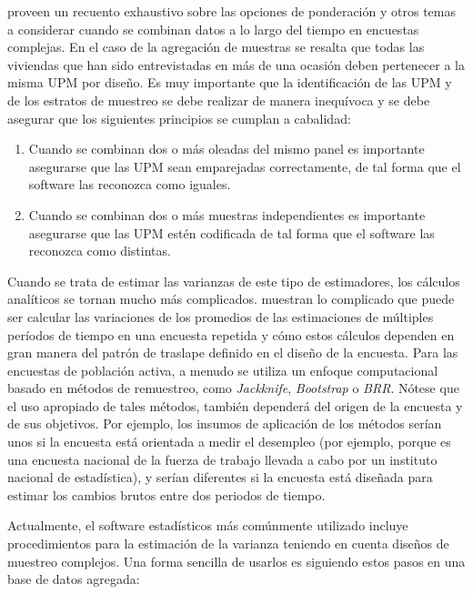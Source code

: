 \documentclass[
  10pt,
  spanish,
]{book}
\providecommand{\tightlist}{%
  \setlength{\itemsep}{0pt}\setlength{\parskip}{0pt}}
\begin{document}
\citet[capítulos 7 y 8]{Korn_Graubard_1999} proveen un recuento exhaustivo
sobre las opciones de ponderación y otros temas a considerar cuando se
combinan datos a lo largo del tiempo en encuestas complejas. En el caso
de la agregación de muestras se resalta que todas las viviendas que han
sido entrevistadas en más de una ocasión deben pertenecer a la misma UPM
por diseño. Es muy importante que la identificación de las UPM y de los
estratos de muestreo se debe realizar de manera inequívoca y se debe
asegurar que los siguientes principios se cumplan a cabalidad:

\begin{enumerate}
\def\labelenumi{\arabic{enumi}.}
\tightlist
\item
  Cuando se combinan dos o más oleadas del mismo panel es importante
  asegurarse que las UPM sean emparejadas correctamente, de tal forma
  que el software las reconozca como iguales.
\item
  Cuando se combinan dos o más muestras independientes es importante
  asegurarse que las UPM estén codificada de tal forma que el software
  las reconozca como distintas.
\end{enumerate}

Cuando se trata de estimar las varianzas de este tipo de estimadores,
los cálculos analíticos se tornan mucho más complicados.
\citet{Train_Cahoon_Makens_1978} muestran lo complicado que puede ser calcular
las variaciones de los promedios de las estimaciones de múltiples
períodos de tiempo en una encuesta repetida y cómo estos cálculos
dependen en gran manera del patrón de traslape definido en el diseño de
la encuesta. Para las encuestas de población activa, a menudo se utiliza
un enfoque computacional basado en métodos de remuestreo, como
\emph{Jackknife}, \emph{Bootstrap} o \emph{BRR}. Nótese que el uso apropiado de tales
métodos, también dependerá del origen de la encuesta y de sus objetivos.
Por ejemplo, los insumos de aplicación de los métodos serían unos si la
encuesta está orientada a medir el desempleo (por ejemplo, porque es una
encuesta nacional de la fuerza de trabajo llevada a cabo por un
instituto nacional de estadística), y serían diferentes si la encuesta
está diseñada para estimar los cambios brutos entre dos periodos de
tiempo.

Actualmente, el software estadísticos más comúnmente utilizado incluye
procedimientos para la estimación de la varianza teniendo en cuenta
diseños de muestreo complejos. Una forma sencilla de usarlos es
siguiendo estos pasos en una base de datos agregada:
\end{document}
